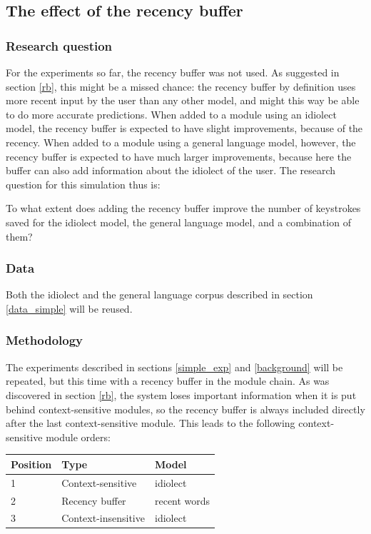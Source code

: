 \documentclass[12pt]{article}
\let\originaltable\table
\let\endoriginaltable\endtable
\renewenvironment{table}[1][ht]{%
  \originaltable[#1]
  \centering}%
  {\endoriginaltable}
\begin{document}
\subsection{The effect of the recency buffer} \label{recbuf}

\subsubsection{Research question}

For the experiments so far, the recency buffer was not used. As suggested in section \ref{rb}, this might be a missed chance: the recency buffer by definition uses more recent input by the user than any other model, and might this way be able to do more accurate predictions. When added to a module using an idiolect model, the recency buffer is expected to have slight improvements, because of the recency. When added to a module using a general language model, however, the recency buffer is expected to have much larger improvements, because here the buffer can also add information about the idiolect of the user. The research question for this simulation thus is:

\begin{examples}
\item To what extent does adding the recency buffer improve the number of keystrokes saved for the idiolect model, the general language model, and a combination of them?
\end{examples}

\subsubsection{Data}

Both the idiolect and the general language corpus described in section \ref{data_simple} will be reused. 

\subsubsection{Methodology}
The experiments described in sections \ref{simple_exp} and \ref{background} will be repeated, but this time with a recency buffer in the module chain. As was discovered in section \ref{rb}, the system loses important information when it is put behind context-sensitive modules, so the recency buffer is always included directly after the last context-sensitive module. This leads to the following context-sensitive module orders:

\begin{table}[H]
\begin{tabular}{lll} 
Position&Type&Model\\
\hline
1&Context-sensitive&idiolect\\
2&Recency buffer&recent words\\
3&Context-insensitive&idiolect\\
\end{tabular} 
\caption{The module order for simulation 1, with the idiolect model and the recency buffer} 
\end{table}
\end{document}
